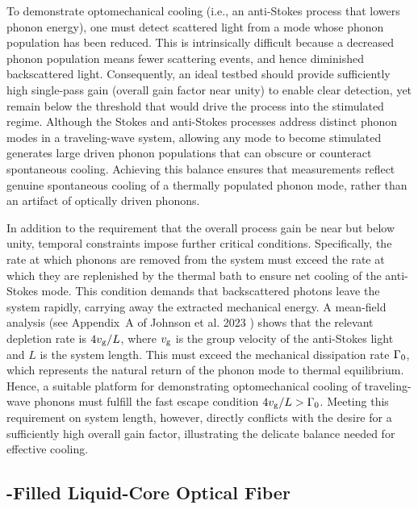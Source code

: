 To demonstrate optomechanical cooling (i.e., an anti-Stokes process that lowers phonon energy), one must detect scattered light from a mode whose phonon population has been reduced. This is intrinsically difficult because a decreased phonon population means fewer scattering events, and hence diminished backscattered light. Consequently, an ideal testbed should provide sufficiently high single-pass gain (overall gain factor near unity) to enable clear detection, yet remain below the threshold that would drive the process into the stimulated regime. Although the Stokes and anti-Stokes processes address distinct phonon modes in a traveling-wave system, allowing any mode to become stimulated generates large driven phonon populations that can obscure or counteract spontaneous cooling. Achieving this balance ensures that measurements reflect genuine spontaneous cooling of a thermally populated phonon mode, rather than an artifact of optically driven phonons.

In addition to the requirement that the overall process gain be near but below unity, temporal constraints impose further critical conditions. Specifically, the rate at which phonons are removed from the system must exceed the rate at which they are replenished by the thermal bath to ensure net cooling of the anti-Stokes mode. This condition demands that backscattered photons leave the system rapidly, carrying away the extracted mechanical energy. A mean-field analysis (see Appendix~A of Johnson et al. 2023 \cite{johnson2023laser}) shows that the relevant depletion rate is \(4v_{\rm g}/L\), where \(v_{\rm g}\) is the group velocity of the anti-Stokes light and \(L\) is the system length. This must exceed the mechanical dissipation rate \(\Gamma_{\rm 0}\), which represents the natural return of the phonon mode to thermal equilibrium. Hence, a suitable platform for demonstrating optomechanical cooling of traveling-wave phonons must fulfill the fast escape condition \(4v_{\rm g}/L > \Gamma_{\rm 0}\). Meeting this requirement on system length, however, directly conflicts with the desire for a sufficiently high overall gain factor, illustrating the delicate balance needed for effective cooling.


\subsection{\texorpdfstring{}{CS2}-Filled Liquid-Core Optical Fiber}
\label{Cooling:subsec:CS2FilledLCOF}

